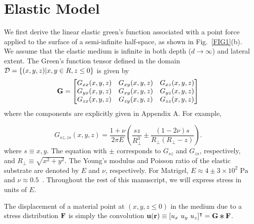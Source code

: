 \documentclass[aps,prl,reprint,twocolumn,groupedaddress,showpacs]{revtex4-1}
\def\r{{\bf r}}
\def\u{{\bf u}}
\def\F{{\bf F}}
\def\F{{\bf F}}
\newcommand{\Conv}{\mathop{\scalebox{1.5}{\raisebox{-0.2ex}{$\ast$}}}}%
\begin{document}
\section{Elastic Model}

We first derive the linear elastic green's function associated with a
point force applied to the surface of a semi-infinite half-space, as
shown in Fig.~\ref{FIG1}(b). We assume that the elastic medium is
infinite in both depth ($d\to \infty$) and lateral extent. The Green's
function tensor defined in the domain ${\cal D}=\left\{(x,y,z)|x,y\in
R,z\leq0\right\}$ is given by
\begin{equation}
{\bf G} = \left[ \begin{matrix} G_{xx}(x,y,z) & G_{xy}(x,y,z) & G_{xz}(x,y,z) \\
	G_{yx}(x,y,z) & G_{xy}(x,y,z) & G_{yz}(x,y,z) \\
	G_{zx}(x,y,z) & G_{zy}(x,y,z) & G_{zz}(x,y,z) 
 \end{matrix} \right]
\end{equation}
where the components are explicitly given in 
Appendix A. For example, 

\begin{equation}
G_{sz, zs}(x,y,z) =
\frac{1+\nu}{2\pi E}\left(\frac{sz}{R_{\perp}^{3}}\pm\frac{(1-2\nu)s}{R_{\perp}
(R_{\perp}-z)}\right).
\end{equation}
%
where $s\equiv x,y$. The equation with $\pm$ corresponds to $G_{sz}$
and $G_{zs}$, respectively, and $R_{\perp} \equiv \sqrt{x^{2}
  +y^{2}}$. The Young's modulus and Poisson ratio of the elastic
substrate are denoted by $E$ and $\nu$, respectively.  
For Matrigel, $E\approx4\pm3\times10^2\textrm{ Pa}$ and
$\nu\approx0.5$~\cite{SOOFIA2009}. Throughout the rest of 
this manuscript, we will express stress in units of $E$. 

The displacement of a material point at $(x,y,z\leq 0)$ in the medium
due to a stress distribution ${\bf F}$ is simply the convolution
$\u(\r) \equiv [u_x \ u_y\ u_z]^\intercal = {\bf G}\Conv\F$.
%
\end{document}
